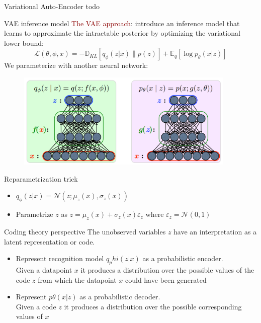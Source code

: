 \documentclass[unicode,11pt]{beamer}
\begin{document}
\begin{frame}[fragile]{Variational Auto-Encoder}
todo
\end{frame}

\begin{frame}[fragile]{VAE inference model}
\textcolor{darkred}{The VAE approach}: introduce an inference model that
learns to approximate the intractable posterior by
optimizing the variational lower bound: 
$$ \mathcal{L}(\theta, \phi, x) = -\mathbb{D}_{KL}[q_\phi (z|x) \parallel p(z)] + \mathbb{E}_q [\log p_\theta (x|z)] $$
We parameterize with another neural network:
\begin{figure}[htbp]
  \includegraphics[height=130pt, keepaspectratio = true]{images/vae}   
\end{figure}

\end{frame}

\begin{frame}[fragile]{Reparametrization trick}
\begin{itemize}
  \item $q_\phi(z|x) = \mathcal{N}(z; \mu_z(x), \sigma_z(x))$
  \item Parametrize $z$ as $z = \mu_z(x) + \sigma_z(x)\varepsilon_z$ where $\varepsilon_z = \mathcal{N}(0, 1)$ 
\end{itemize}
\end{frame}

\begin{frame}[fragile]{Coding theory perspective}
The unobserved variables $z$ have an interpretation as a latent representation or code.

\begin{itemize}
  \item Represent recognition model $q_phi(z|x)$ as a probabilistic encoder.\\
        Given a datapoint $x$ it produces a distribution over the possible values of the code $z$ from which the datapoint $x$ could have been generated
  \item Represent $p\theta(x|z)$ as a probabilistic decoder.\\
        Given a code $z$ it produces a distribution over the possible corresponding values of $x$
\end{itemize}
\end{frame}
\end{document}
